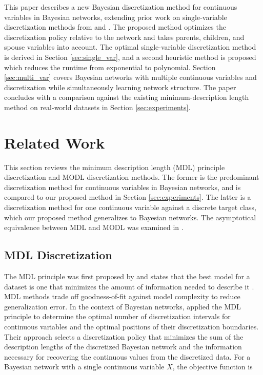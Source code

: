 This paper describes a new Bayesian discretization method for continuous variables in Bayesian networks, extending prior work on single-variable discretization methods from \citet{Boulle_2006} and \citet{Lustgarten_2011}.
The proposed method optimizes the discretization policy relative to the network and takes parents, children, and spouse variables into account.
The optimal single-variable discretization method is derived in Section \ref{sec:single_var}, and a second heuristic method is proposed which reduces the runtime from exponential to polynomial.
Section \ref{sec:multi_var} covers Bayesian networks with multiple continuous variables and discretization while simultaneously learning network structure.
The paper concludes with a comparison against the existing minimum-description length \citep{Friedman_1996} method on real-world datasets in Section \ref{sec:experiments}.


\section{Related Work}
\label{sec:related_work}
This section reviews the minimum description length (MDL) principle discretization \citep{Friedman_1996} and MODL discretization \citep{Boulle_2006} methods.
The former is the predominant discretization method for continuous variables in Bayesian networks, and is compared to our proposed method in Section \ref{sec:experiments}.
The latter is a discretization method for one continuous variable against a discrete target class, which our proposed method generalizes to Bayesian networks.
The asymptotical equivalence between MDL and MODL was examined in \citep{VL_2000}.

\subsection{MDL Discretization}
The MDL principle was first proposed by \cite{MDL_1978} and states that the best model for a dataset is one that minimizes the amount of information needed to describe it \citep{Grunwald_2009}.
MDL methods trade off goodness-of-fit against model complexity to reduce generalization error.
In the context of Bayesian networks, \cite{Friedman_1996} applied the MDL principle to determine the optimal number of discretization intervals for continuous variables and the optimal positions of their discretization boundaries.
Their approach selects a discretization policy that minimizes the sum of the description lengths of the discretized Bayesian network and the information necessary for recovering the continuous values from the discretized data.
For a Bayesian network with a single continuous variable $X$, the objective function is

